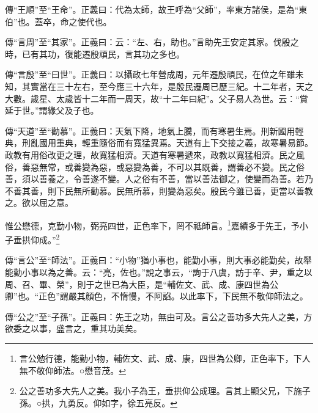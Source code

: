 {\noindent\zhuan{}\fzbyks 傳“王順”至“王命”。正義曰：代為太師，故王呼為“父師”，率東方諸侯，是為“東伯”也。蓋卒，命之使代也。 \par}

{\noindent\zhuan{}\fzbyks 傳“言周”至“其家”。正義曰：云：“左、右，助也。”言助先王安定其家。伐殷之時，已有其功，復能遷殷頑民，言其功之多也。 \par}

{\noindent\zhuan{}\fzbyks 傳“言殷”至“曰世”。正義曰：以攝政七年營成周，元年遷殷頑民，在位之年雖未知，其實當在三十左右，至今應三十六年，是殷民遷周已歷三紀。十二年者，天之大數。歲星、太歲皆十二年而一周天，故“十二年曰紀”。父子易人為世。云：“賞延于世。”謂緣父及子也。 \par}

{\noindent\zhuan{}\fzbyks 傳“天道”至“勸慕”。正義曰：天氣下降，地氣上騰，而有寒暑生焉。刑新國用輕典，刑亂國用重典，輕重隨俗而有寬猛異焉。天道有上下交接之義，故寒暑易節。政教有用俗改更之理，故寬猛相濟。天道有寒暑遞來，政教以寬猛相濟。民之風俗，善惡無常，或善變為惡，或惡變為善，不可以其既善，謂善必不變。民之俗善，須以善養之，令善遂不變。人之俗有不善，當以善法御之，使變而為善。若乃不善其善，則下民無所勸慕。民無所慕，則變為惡矣。殷民今雖已善，更當以善教之。欲以屈之意。 \par}

惟公懋德，克勤小物，弼亮四世，正色率下，罔不祗師言。\footnote{言公勉行德，能勤小物，輔佐文、武、成、康，四世為公卿，正色率下，下人無不敬仰師法。○懋音茂。}嘉績多于先王，予小子垂拱仰成。”\footnote{公之善功多大先人之美。我小子為王，垂拱仰公成理。言其上顯父兄，下施子孫。○拱，九勇反。仰如字，徐五亮反。}

{\noindent\zhuan{}\fzbyks 傳“言公”至“師法”。正義曰：“小物”猶小事也，能勤小事，則大事必能勤矣，故舉能勤小事以為之善。云：“亮，佐也。”說之事云，“詢于八虞，訪于辛、尹，重之以周、召、畢、榮”，則于之世已為大臣，是“輔佐文、武、成、康四世為公卿”也。“正色”謂嚴其顏色，不惰慢，不阿諂。以此率下，下民無不敬仰師法之。 \par}

{\noindent\zhuan{}\fzbyks 傳“公之”至“子孫”。正義曰：先王之功，無由可及。言公之善功多大先人之美，方欲委之以事，盛言之，重其功美矣。 \par}

